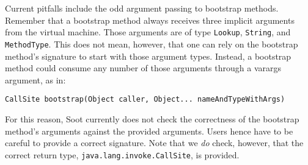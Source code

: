 \documentclass{article}
\begin{document}
Current pitfalls include the odd argument passing to bootstrap methods. Remember
that a bootstrap method always receives three implicit arguments from the
virtual machine. Those arguments are of type \texttt{Lookup}, \texttt{String},
and \texttt{MethodType}. This does not mean, however, that one can rely on the
bootstrap method's signature to start with those argument types. Instead, a
bootstrap method could consume any number of those arguments through a varargs
argument, as in:
\begin{verbatim}
CallSite bootstrap(Object caller, Object... nameAndTypeWithArgs)
\end{verbatim}
For this reason, Soot currently does not check the correctness of the bootstrap
method's arguments against the provided arguments. Users hence have to be
careful to provide a correct signature. Note that we \emph{do} check, however,
that the correct return type, \texttt{java.lang.invoke.CallSite}, is provided.
\end{document}
